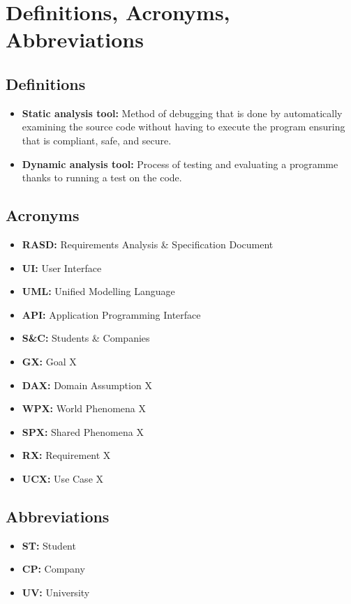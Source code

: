 \section{Definitions, Acronyms, Abbreviations}
\label{sec:definitions_acronyms_abbreviations}%

\subsection{Definitions}
\label{subsec:definitions}%
\begin{itemize}
    \item \textbf{Static analysis tool:} Method of debugging that is done by automatically examining the source code without having to execute the program ensuring that is compliant, safe, and secure.
    \item \textbf{Dynamic analysis tool:} Process of testing and evaluating a programme thanks to running a test on the code.
\end{itemize}


\subsection{Acronyms}
\label{subsec:acronyms}%
\begin{itemize}
    \item \textbf{RASD:} Requirements Analysis \& Specification Document 
    \item \textbf{UI:} User Interface
    \item \textbf{UML:} Unified Modelling Language
    \item \textbf{API:} Application Programming Interface
    \item \textbf{S\&C:} Students \& Companies
    \item \textbf{GX:} Goal X
    \item \textbf{DAX:} Domain Assumption X 
    \item \textbf{WPX:} World Phenomena X
    \item \textbf{SPX:} Shared Phenomena X
    \item \textbf{RX:} Requirement X
    \item \textbf{UCX:} Use Case X
\end{itemize}


\subsection{Abbreviations}
\label{subsec:abbreviations}%
\begin{itemize}
    \item \textbf{ST:} Student
    \item \textbf{CP:} Company
    \item \textbf{UV:} University
\end{itemize}


